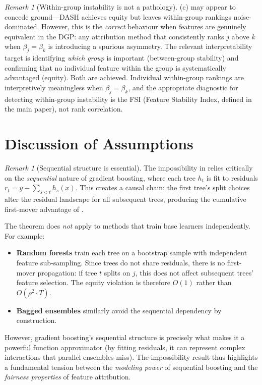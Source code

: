 \documentclass[11pt]{article}
\theoremstyle{remark}
\newtheorem{remark}[theorem]{Remark}
\newcommand{\totalT}{T}                     %
\newcommand{\rhovar}{\rho}                  %
\newcommand{\dash}{\textsc{DASH}}
\begin{document}
\begin{remark}[Within-group instability is not a pathology]
\label{rem:within-group}
(c) may appear to concede ground---\dash{} achieves equity
but leaves within-group rankings noise-dominated.  However, this is the
\emph{correct} behaviour when features are genuinely equivalent in the DGP:
any attribution method that consistently ranks $j$ above $k$ when
$\beta_j = \beta_k$ is introducing a spurious asymmetry.  The relevant
interpretability target is identifying \emph{which group} is important
(between-group stability) and confirming that no individual feature within
the group is systematically advantaged (equity).  Both are achieved.
Individual within-group rankings are interpretively meaningless when
$\beta_j = \beta_k$, and the appropriate diagnostic for detecting
within-group instability is the FSI (Feature Stability Index, defined in
the main paper), not rank correlation.
\end{remark}


\section{Discussion of Assumptions}
\label{sec:assumptions}

\begin{remark}[Sequential structure is essential]
\label{rem:sequential}
The impossibility in  relies critically on the
\emph{sequential} nature of gradient boosting, where each tree $h_t$ is
fit to residuals $r_t = y - \sum_{s<t} h_s(x)$.  This creates a causal
chain: the first tree's split choices alter the residual landscape for all
subsequent trees, producing the cumulative first-mover advantage of
.

The theorem does \emph{not} apply to methods that train base learners
independently.  For example:
\begin{itemize}
  \item \textbf{Random forests} train each tree on a bootstrap sample with
    independent feature sub-sampling.  Since trees do not share residuals,
    there is no first-mover propagation: if tree $t$ splits on $j$, this
    does not affect subsequent trees' feature selection.  The equity violation
    is therefore $O(1)$ rather than $O(\rhovar^2 \cdot \totalT)$.
  \item \textbf{Bagged ensembles} similarly avoid the sequential dependency
    by construction.
\end{itemize}
However, gradient boosting's sequential structure is precisely what makes
it a powerful function approximator (by fitting residuals, it can represent
complex interactions that parallel ensembles miss).  The impossibility
result thus highlights a fundamental tension between the \emph{modeling
power} of sequential boosting and the \emph{fairness properties} of
feature attribution.
\end{remark}
\end{document}
